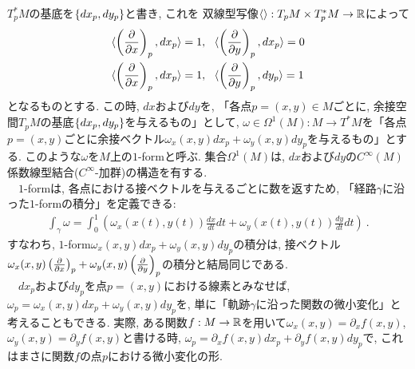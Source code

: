 $T^{*}_pM$の基底を$\left\{{dx_p, dy_p}\right\}$と書き, これを
双線型写像$\langle \rangle: T_pM \times T^{*}_pM \to \mathbb{R}$によって
\begin{align}
   & \langle \left({\frac{\partial}{\partial x}}\right)_p, dx_p \rangle = 1,~~ \langle \left({\frac{\partial}{\partial y}}\right)_p, dx_p \rangle = 0\\
    &\langle \left({\frac{\partial}{\partial x}}\right)_p, dx_p \rangle = 1,~~ \langle \left({\frac{\partial}{\partial y}}\right)_p, dy_p \rangle = 1
\end{align}
となるものとする. この時, $dx$および$dy$を, 「各点$p=(x,y)\in M$ごとに, 余接空間$T_p M$の基底$\left\{{dx_p, dy_p}\right\}$を与えるもの」として, 
$\omega\in \Omega^{1}(M): M\to T^{*}M$を「各点$p=(x,y)$ごとに余接ベクトル$\omega_x(x, y)dx_p + \omega_y(x,y)dy_p$を与えるもの」とする. 
このような$\omega$を$M$上の$1$-formと呼ぶ. 
集合$\Omega^{1}(M)$は, $dx$および$dy$の$C^{\infty}(M)$係数線型結合($C^{\infty}$-加群)の構造を有する. \\
　$1$-formは, 各点における接ベクトルを与えるごとに数を返すため, 「経路$\gamma$に沿った$1$-formの積分」を定義できる: 
\begin{align}
    \int_{\gamma} \omega
    =\int_{0}^{1} \left(\omega_x(x(t), y(t))\frac{dx}{dt}dt + \omega_y(x(t), y(t))\frac{dy}{dt}dt \right)~.
\end{align}
すなわち, $1$-form$\omega_x(x, y)dx_p + \omega_y(x, y)dy_p$の積分は, 接ベクトル$\omega_x(x, y)\left({\frac{\partial}{\partial x}}\right)_p + \omega_y(x,y)\left({\frac{\partial}{\partial y}}\right)_p$の積分と結局同じである. \\
　$dx_p$および$dy_p$を点$p=(x,y)$における線素とみなせば, $\omega_p = \omega_x(x,y)dx_p + \omega_y(x,y)dy_p$を, 単に「軌跡$\gamma$に沿った関数の微小変化」と考えることもできる. 
実際, ある関数$f: M\to \mathbb{R}$を用いて$\omega_x(x,y)=\partial_x f(x,y)$, $\omega_y(x,y) = \partial_y f(x,y)$と書ける時, 
$\omega_p = \partial_x f(x,y) dx_p + \partial_y f(x,y) dy_p$で, これはまさに関数$f$の点$p$における微小変化の形. 
